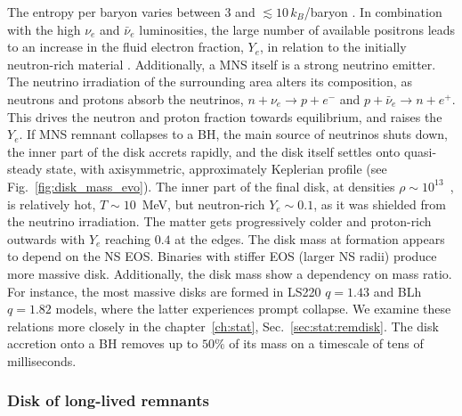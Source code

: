 The entropy per baryon varies between $3$ and $\lesssim 10\,$$k_{B}$/baryon \citep{Perego:2019adq}.
In combination with the high $\nu_e$ and $\bar{\nu}_e$ luminosities,
the large number of available positrons leads to an increase 
in the fluid electron fraction, $Y_e$, in relation to the initially neutron-rich material
\citep{Qian:1996xt}.
%
Additionally, a \ac{MNS} itself is a strong neutrino emitter. The neutrino irradiation of the 
surrounding area alters its composition, as neutrons and protons absorb the neutrinos,
$n+\nu_e\rightarrow p + e^{-}$ and $p + \bar{\nu}_e\rightarrow n + e^+$.
This drives the neutron and proton fraction towards equilibrium, and raises the $Y_e$.
If \ac{MNS} remnant collapses to a \ac{BH}, the main source of neutrinos shuts down,  
the inner part of the disk accrets rapidly, and the disk itself settles onto quasi-steady state, 
with axisymmetric, approximately Keplerian profile (see Fig.~\ref{fig:disk_mass_evo}).
%
The inner part of the final disk, at densities $\rho\sim10^{13}$~\gcm, 
is relatively hot, $T\sim10\,$ MeV, but neutron-rich $Y_e\sim0.1$, as it was shielded 
from the neutrino irradiation. The matter gets progressively colder and proton-rich 
outwards with $Y_e$ reaching $0.4$ at the edges.
%
The disk mass at formation appears to depend on the \ac{NS} \ac{EOS}. Binaries with 
stiffer \ac{EOS} (larger \ac{NS} radii) produce more massive disk.
Additionally, the disk mass show a dependency on mass ratio. For instance, the most massive 
disks are formed in LS220 $q=1.43$ and  BLh $q=1.82$ models, where the latter experiences prompt collapse.
%
We examine these relations more closely in the chapter~\ref{ch:stat}, Sec.~\ref{sec:stat:remdisk}.
The disk accretion onto a \ac{BH} removes up to $50\%$ of its mass on a timescale of tens of milliseconds.


\subsubsection*{Disk of long-lived remnants}


